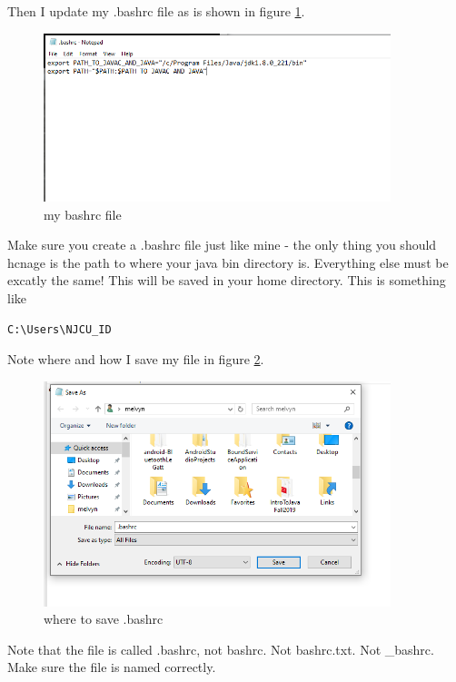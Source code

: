 \documentclass[12pt]{article}
\begin{document}
Then I update my .bashrc file as is shown in figure \ref{mybashrc}.

\begin{figure}[h]
  \centering
    \includegraphics[width=0.9\textwidth]{Images/my_bashrc.PNG}
  \caption{my bashrc file}
	\label{mybashrc}
\end{figure}

Make sure you create a .bashrc file just like mine - the only thing you should
hcnage is the path to where your java bin directory is. Everything else must be
excatly the same! This will be saved in your home directory. This is something
like

\begin{verbatim}
C:\Users\NJCU_ID
\end{verbatim}

Note where and how I save my file in figure \ref{savebashrc}.

\begin{figure}[h]
  \centering
    \includegraphics[width=0.9\textwidth]{Images/bashrcSaving.PNG}
  \caption{where to save .bashrc}
	\label{savebashrc}
\end{figure}

\begin{center}
{\LARGE Note that the file is called .bashrc, not bashrc. Not bashrc.txt. Not
\_bashrc.  Make sure the file is named correctly.}
\end{center}
\end{document}

